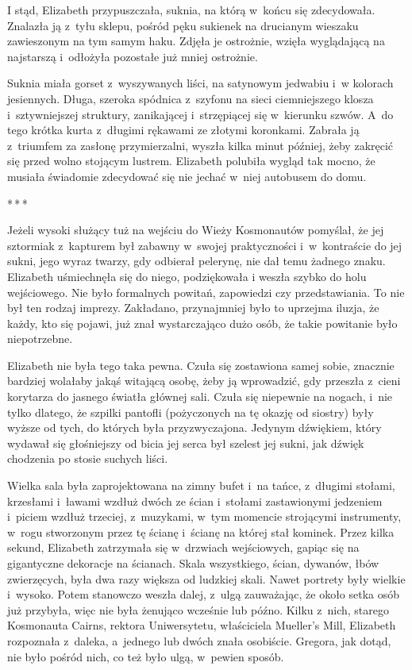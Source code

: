 \documentclass[oneside,polish,12pt,sfheadings]{mwbk}
\newcommand{\threeast}{\bigskip\par\centerline{*\,*\,*}\medskip\par}%
\begin{document}
I stąd, Elizabeth przypuszczała, suknia, na którą w~końcu się
zdecydowała. Znalazła ją z~tyłu sklepu, pośród pęku sukienek na
drucianym wieszaku zawieszonym na tym samym haku. Zdjęła je ostrożnie,
wzięła wyglądającą na najstarszą i~odłożyła pozostałe już mniej
ostrożnie.

Suknia miała gorset z~wyszywanych liści, na satynowym jedwabiu i~w
kolorach jesiennych. Długa, szeroka spódnica z~szyfonu na sieci
ciemniejszego klosza i~sztywniejszej struktury, zanikającej i~strzępiącej się w~kierunku szwów. A~do tego krótka kurta z~długimi
rękawami ze złotymi koronkami. Zabrała ją z~triumfem za zasłonę
przymierzalni, wyszła kilka minut później, żeby zakręcić się przed
wolno stojącym lustrem. Elizabeth polubiła wygląd tak mocno, że musiała
świadomie zdecydować się nie jechać w~niej autobusem do domu.

\threeast

Jeżeli wysoki służący tuż na wejściu do Wieży Kosmonautów pomyślał, że
jej sztormiak z~kapturem był zabawny w~swojej praktyczności i~w~kontraście do jej sukni, jego wyraz twarzy, gdy odbierał pelerynę, nie
dał temu żadnego znaku. Elizabeth uśmiechnęła się do niego, podziękowała
i weszła szybko do holu wejściowego. Nie było formalnych powitań,
zapowiedzi czy przedstawiania. To nie był ten rodzaj imprezy. Zakładano,
przynajmniej było to uprzejma iluzja, że każdy, kto się pojawi, już znał
wystarczająco dużo osób, że takie powitanie było niepotrzebne.

Elizabeth nie była tego taka pewna. Czuła się zostawiona samej sobie,
znacznie bardziej wolałaby jakąś witającą osobę, żeby ją wprowadzić, gdy
przeszła z~cieni korytarza do jasnego światła głównej sali. Czuła się
niepewnie na nogach, i~nie tylko dlatego, że szpilki pantofli
(pożyczonych na tę okazję od siostry) były wyższe od tych, do których
była przyzwyczajona. Jedynym dźwiękiem, który wydawał się głośniejszy od
bicia jej serca był szelest jej sukni, jak dźwięk chodzenia po stosie
suchych liści.

Wielka sala była zaprojektowana na zimny bufet i~na tańce, z~długimi
stołami, krzesłami i~ławami wzdłuż dwóch ze ścian i~stołami zastawionymi
jedzeniem i~piciem wzdłuż trzeciej, z~muzykami, w~tym momencie
strojącymi instrumenty, w~rogu stworzonym przez tę ścianę i~ścianę na
której stał kominek. Przez kilka sekund, Elizabeth zatrzymała się w~drzwiach wejściowych, gapiąc się na gigantyczne dekoracje na ścianach.
Skala wszystkiego, ścian, dywanów, łbów zwierzęcych, była dwa razy
większa od ludzkiej skali. Nawet portrety były wielkie i~wysoko. Potem
stanowczo weszła dalej, z~ulgą zauważając, że około setka osób już
przybyła, więc nie była żenująco wcześnie lub późno. Kilku z~nich,
starego Kosmonauta Cairns, rektora Uniwersytetu, właściciela Mueller's
Mill, Elizabeth rozpoznała z~daleka, a~jednego lub dwóch znała
osobiście. Gregora, jak dotąd, nie było pośród nich, co też było ulgą, w~pewien sposób.
\end{document}
